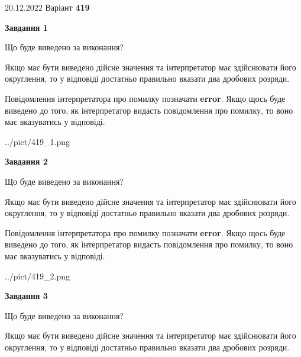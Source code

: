 \documentclass[12pt, ukrainian]{article}
\begin{document}
{20.12.2022 Варіант \No \textbf { 419 }\par}
{
\begin {Large}

{\begin {center}\textbf{Завдання 1}\end {center}}\par
Що буде виведено за виконання? \par

Якщо має бути виведено дійсне значення та інтерпретатор має здійснювати його округлення, 
то у відповіді достатньо правильно вказати два дробових розряди.

Повідомлення інтерпретатора про помилку позначати \textbf{error}.
Якщо щось буде виведено до того, як інтерпретатор видасть повідомлення про помилку, 
то воно має вказуватись у відповіді. \par

\begin{center}
	{../pict/419_1.png}
\end{center}
\newpage

{\begin {center}\textbf{Завдання 2}\end {center}}\par
Що буде виведено за виконання? \par

Якщо має бути виведено дійсне значення та інтерпретатор має здійснювати його округлення, 
то у відповіді достатньо правильно вказати два дробових розряди.

Повідомлення інтерпретатора про помилку позначати \textbf{error}.
Якщо щось буде виведено до того, як інтерпретатор видасть повідомлення про помилку, 
то воно має вказуватись у відповіді. \par

\begin{center}
	{../pict/419_2.png}
\end{center}
\newpage

{\begin {center}\textbf{Завдання 3}\end {center}}\par
Що буде виведено за виконання? \par

Якщо має бути виведено дійсне значення та інтерпретатор має здійснювати його округлення, 
то у відповіді достатньо правильно вказати два дробових розряди.


\end{Large}}
\end{document}
